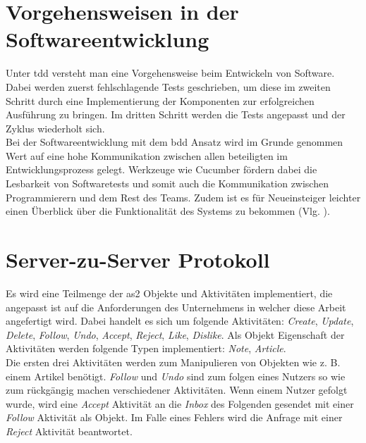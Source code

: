 \section{Vorgehensweisen in der Softwareentwicklung}
Unter \gls{tdd} versteht man eine Vorgehensweise beim Entwickeln von Software. Dabei werden zuerst fehlschlagende Tests geschrieben, um diese im zweiten Schritt durch eine Implementierung der Komponenten zur erfolgreichen Ausführung zu bringen. Im dritten Schritt werden die Tests angepasst und der Zyklus wiederholt sich.\\

Bei der Softwareentwicklung mit dem \gls{bdd} Ansatz wird im Grunde genommen Wert auf eine hohe Kommunikation zwischen allen beteiligten im Entwicklungsprozess gelegt. Werkzeuge wie Cucumber fördern dabei die Lesbarkeit von Softwaretests und somit auch die Kommunikation zwischen Programmierern und dem Rest des Teams. Zudem ist es für Neueinsteiger leichter einen Überblick über die Funktionalität des Systems zu bekommen (Vlg. \cite{cucumber}).

\section{Server-zu-Server Protokoll}
\label{sec:server-zu-server-prot}
Es wird eine Teilmenge der \gls{as2} Objekte und Aktivitäten implementiert, die angepasst ist auf die Anforderungen des Unternehmens in welcher diese Arbeit angefertigt wird. Dabei handelt es sich um folgende Aktivitäten: \textit{Create}, \textit{Update}, \textit{Delete}, \textit{Follow}, \textit{Undo}, \textit{Accept}, \textit{Reject}, \textit{Like}, \textit{Dislike}. Als Objekt Eigenschaft der Aktivitäten werden folgende Typen implementiert: \textit{Note}, \textit{Article}.\\

Die ersten drei Aktivitäten werden zum Manipulieren von Objekten wie z. B. einem Artikel benötigt. \textit{Follow} und \textit{Undo} sind zum folgen eines Nutzers so wie zum rückgängig machen verschiedener Aktivitäten. Wenn einem Nutzer gefolgt wurde, wird eine \textit{Accept} Aktivität an die \textit{Inbox} des Folgenden gesendet mit einer \textit{Follow} Aktivität als Objekt. Im Falle eines Fehlers wird die Anfrage mit einer \textit{Reject} Aktivität beantwortet.\\

